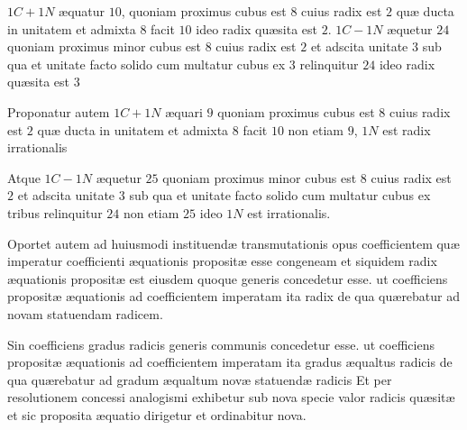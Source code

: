 \documentclass[11pt,a4paper]{article}
\begin{document}

$1C + 1N$ æquatur $10$, quoniam proximus cubus est $8$ cuius radix est $2$ quæ ducta in unitatem et admixta $8$ facit $10$ ideo radix quæsita est $2$.  $1C - 1N$ æquetur $24$ quoniam proximus minor cubus est $8$ cuius radix est $2$ et adscita unitate $3$ sub qua et unitate facto solido cum multatur cubus ex $3$ relinquitur $24$ ideo radix quæsita est $3$

Proponatur autem $1C + 1N$ æquari $9$ quoniam proximus cubus est $8$ cuius radix est $2$ quæ ducta in unitatem et admixta $8$ facit $10$ non etiam $9$, $1N$ est radix irrationalis

Atque $1C - 1N$ æquetur $25$ quoniam proximus minor cubus est $8$ cuius radix est \struck{\ill{}} $2$ et adscita unitate $3$ sub qua et unitate facto solido cum multatur cubus ex tribus relinquitur $24$ non etiam $25$ ideo $1N$ est irrationalis.

Oportet autem ad huiusmodi instituendæ transmutationis opus coefficientem quæ imperatur coefficienti æquationis propositæ esse congeneam et siquidem radix æquationis propositæ est eiusdem quoque generis concedetur esse. ut coefficiens propositæ æquationis ad coefficientem imperatam ita radix de qua quærebatur ad novam statuendam radicem.

Sin coefficiens gradus radicis generis communis concedetur esse. ut coefficiens propositæ æquationis ad coefficientem imperatam ita gradus æqualtus radicis de qua quærebatur ad gradum æqualtum novæ statuendæ radicis Et per resolutionem concessi analogismi exhibetur sub nova specie valor radicis quæsitæ et sic proposita æquatio dirigetur et ordinabitur nova.
\end{document}
